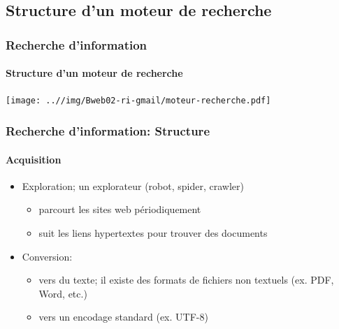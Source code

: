 \documentclass{beamer}
\begin{document}
\subsection{Structure d'un moteur de recherche}

\begin{frame}
\frametitle{Recherche d'information}
\framesubtitle{Structure d'un moteur de recherche}

\begin{center}
	\texttt{[image: ..//img/Bweb02-ri-gmail/moteur-recherche.pdf]}
\end{center}

\end{frame}

\begin{frame}
\frametitle{Recherche d'information: Structure}
\framesubtitle{Acquisition}

\begin{itemize}
	\item Exploration; un explorateur (robot, spider, crawler)
	\begin{itemize}
		\item parcourt les sites web périodiquement 
		\item suit les liens hypertextes pour trouver des documents
	\end{itemize}

	\item Conversion:
	\begin{itemize}
		\item vers du texte; il existe des formats de fichiers non textuels (ex. PDF, Word, etc.)
		\item vers un encodage standard (ex. UTF-8)
	\end{itemize}
\end{itemize}

\end{frame}
\end{document}
